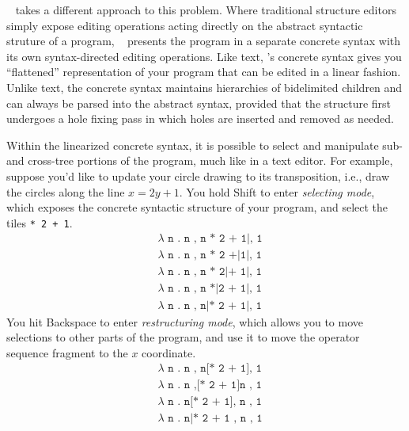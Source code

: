 \tylr~ takes a different approach to this problem.
Where traditional structure editors simply expose editing
operations acting directly on the abstract syntactic struture
of a program, \tylr~ presents the program in a separate
concrete syntax with its own syntax-directed editing operations.
Like text, \tylr's concrete syntax gives you ``flattened''
representation of your program that can be edited in a linear fashion.
Unlike text, the concrete syntax maintains hierarchies of
bidelimited children and can always be parsed into
the abstract syntax, provided that the structure first undergoes
a hole fixing pass in which holes are inserted and removed
as needed.

Within the linearized concrete syntax, it is possible to
select and manipulate sub- and cross-tree portions of the program,
much like in a text editor. For example, suppose you'd like
to update your circle drawing to its transposition,
i.e., draw the circles along the line $x = 2y + 1$.
You hold Shift to enter \emph{selecting mode}, which exposes
the concrete syntactic structure of your program, and select
the tiles \texttt{* 2 + 1}.
\begin{align*}
  & \texttt{$\lambda$ n . n , n * 2 + 1|, 1} \\
  & \texttt{$\lambda$ n . n , n * 2 +|1|, 1} \\
  & \texttt{$\lambda$ n . n , n * 2|+ 1|, 1} \\
  & \texttt{$\lambda$ n . n , n *|2 + 1|, 1} \\
  & \texttt{$\lambda$ n . n , n|* 2 + 1|, 1}
\end{align*}
You hit Backspace to enter \emph{restructuring mode}, which
allows you to move selections to other parts of the program,
and use it to move the operator sequence fragment to the
$x$ coordinate.
\begin{align*}
  & \texttt{$\lambda$ n . n , n[* 2 + 1], 1} \\
  & \texttt{$\lambda$ n . n ,[* 2 + 1]n , 1} \\
  & \texttt{$\lambda$ n . n[* 2 + 1], n , 1} \\
  & \texttt{$\lambda$ n . n|* 2 + 1 , n , 1}
\end{align*}

